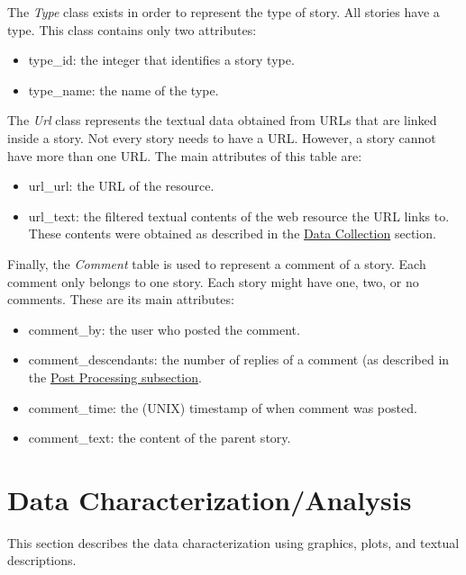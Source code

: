 \documentclass[sigconf]{acmart}
\begin{document}
The \textit{Type} class exists in order to represent the type 
of story. All stories have a type. This class contains only 
two attributes:

\begin{itemize}
    \item type\_id: the integer that identifies a story type.
    \item type\_name: the name of the type. 
\end{itemize}

The \textit{Url} class represents the textual data obtained from 
URLs that are linked inside a story. Not every story needs 
to have a URL. However, a story cannot have more than one URL.
The main attributes of this table are:

\begin{itemize}
    \item url\_url: the URL of the resource.
    \item url\_text: the filtered textual contents of the 
    web resource the URL links to. These contents were obtained 
    as described in the 
    \hyperref[sec:collection]{Data Collection} section.
\end{itemize}

Finally, the \textit{Comment} table is used to represent 
a comment of a story. Each comment only belongs to one story.
Each story might have one, two, or no comments. These are its
main attributes: 

\begin{itemize}
    \item comment\_by: the user who posted the comment.
    \item comment\_descendants: the number of replies of a comment
    (as described in the \hyperref[sec:post_processing]{Post Processing subsection}.
    \item comment\_time: the (UNIX) timestamp of when comment was
    posted.
    \item comment\_text: the content of the parent story.
\end{itemize}

\section{Data Characterization/Analysis}
\label{sec:analysis}
This section describes the data characterization using graphics,
plots, and textual descriptions.
\end{document}
